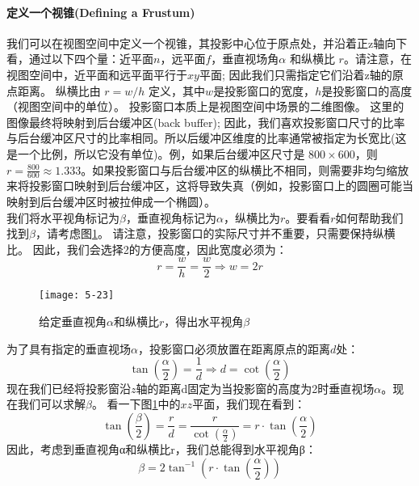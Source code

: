 \paragraph{定义一个视锥(Defining a Frustum)}
\begin{flushleft}
我们可以在视图空间中定义一个视锥，其投影中心位于原点处，并沿着正z轴向下看，通过以下四个量：近平面$n$，远平面$f$，垂直视场角$\alpha$ 和纵横比 $r$。请注意，在视图空间中，近平面和远平面平行于$xy$平面; 因此我们只需指定它们沿着z轴的原点距离。 纵横比由 $r=w/h$ 定义，其中$w$是投影窗口的宽度，$h$是投影窗口的高度（视图空间中的单位）。 投影窗口本质上是视图空间中场景的二维图像。 这里的图像最终将映射到后台缓冲区(back buffer); 因此，我们喜欢投影窗口尺寸的比率与后台缓冲区尺寸的比率相同。所以后缓冲区维度的比率通常被指定为长宽比(这是一个比例，所以它没有单位)。例，如果后台缓冲区尺寸是 $800 \times 600$，则 $r=\frac{800}{600} \approx 1.333$。如果投影窗口与后台缓冲区的纵横比不相同，则需要非均匀缩放来将投影窗口映射到后台缓冲区，这将导致失真（例如，投影窗口上的圆圈可能当映射到后台缓冲区时被拉伸成一个椭圆）。\\
我们将水平视角标记为$\beta$，垂直视角标记为$\alpha$，纵横比为$r$。要看看$r$如何帮助我们找到$\beta$，请考虑图\ref{fig:5-23}。 请注意，投影窗口的实际尺寸并不重要，只需要保持纵横比。 因此，我们会选择2的方便高度，因此宽度必须为：\\
$$r=\frac{w}{h}=\frac{w}{2}\Rightarrow w=2r$$
\end{flushleft}
\begin{figure}[t]
    \texttt{[image: 5-23]}
    \centering
    \caption{给定垂直视角$\alpha$和纵横比$r$，得出水平视角$\beta$}
    \label{fig:5-23}
\end{figure}
\begin{flushleft}
为了具有指定的垂直视场$\alpha$，投影窗口必须放置在距离原点的距离$d$处：
$$\tan(\frac{\alpha}{2})=\frac{1}{d}\Rightarrow d=\cot(\frac{\alpha}{2})$$
现在我们已经将投影窗沿$z$轴的距离d固定为当投影窗的高度为2时垂直视场$\alpha$。现在我们可以求解$\beta$。 看一下图\ref{fig:5-23}中的$xz$平面，我们现在看到：
$$\tan(\frac{\beta}{2})=\frac{r}{d}=\frac{r}{\cot(\frac{\alpha}{2})}=r\cdot \tan(\frac{\alpha}{2})$$
因此，考虑到垂直视角α和纵横比r，我们总能得到水平视角β：
$$\beta=2\tan^{-1}(r\cdot\tan(\frac{\alpha}{2}))$$
\end{flushleft}

